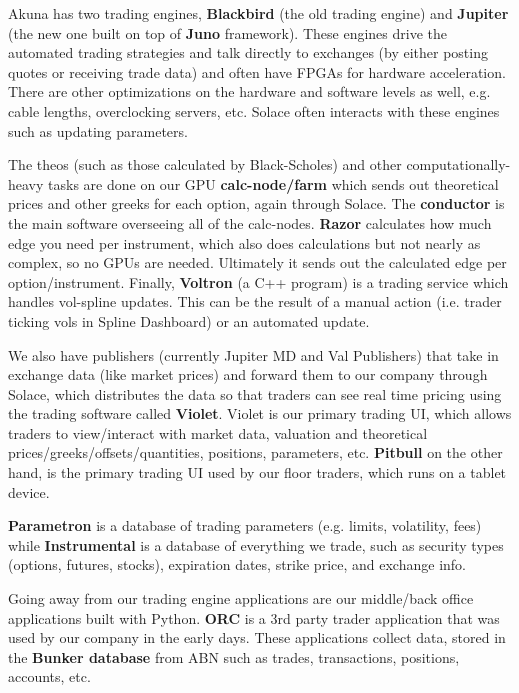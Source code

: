 \documentclass{article}
\begin{document}
    Akuna has two trading engines, \textbf{Blackbird} (the old trading engine) and \textbf{Jupiter} (the new one built on top of \textbf{Juno} framework). These engines drive the automated trading strategies and talk directly to exchanges (by either posting quotes or receiving trade data) and often have FPGAs for hardware acceleration. There are other optimizations on the hardware and software levels as well, e.g. cable lengths, overclocking servers, etc. Solace often interacts with these engines such as updating parameters.

    The theos (such as those calculated by Black-Scholes) and other computationally-heavy tasks are done on our GPU \textbf{calc-node/farm} which sends out theoretical prices and other greeks for each option, again through Solace. The \textbf{conductor} is the main software overseeing all of the calc-nodes. \textbf{Razor} calculates how much edge you need per instrument, which also does calculations but not nearly as complex, so no GPUs are needed. Ultimately it sends out the calculated edge per option/instrument. Finally, \textbf{Voltron} (a C++ program) is a trading service which handles vol-spline updates. This can be the result of a manual action (i.e. trader ticking vols in Spline Dashboard) or an automated update.

    We also have publishers (currently Jupiter MD and Val Publishers) that take in exchange data (like market prices) and forward them to our company through Solace, which distributes the data so that traders can see real time pricing using the trading software called \textbf{Violet}. Violet is our primary trading UI, which allows traders to view/interact with market data, valuation and theoretical prices/greeks/offsets/quantities, positions, parameters, etc. \textbf{Pitbull} on the other hand, is the primary trading UI used by our floor traders, which runs on a tablet device.

    \textbf{Parametron} is a database of trading parameters (e.g. limits, volatility, fees) while \textbf{Instrumental} is a database of everything we trade, such as security types (options, futures, stocks), expiration dates, strike price, and exchange info.

    Going away from our trading engine applications are our middle/back office applications built with Python. \textbf{ORC} is a 3rd party trader application that was used by our company in the early days. These applications collect data, stored in the \textbf{Bunker database} from ABN such as trades, transactions, positions, accounts, etc.
\end{document}
